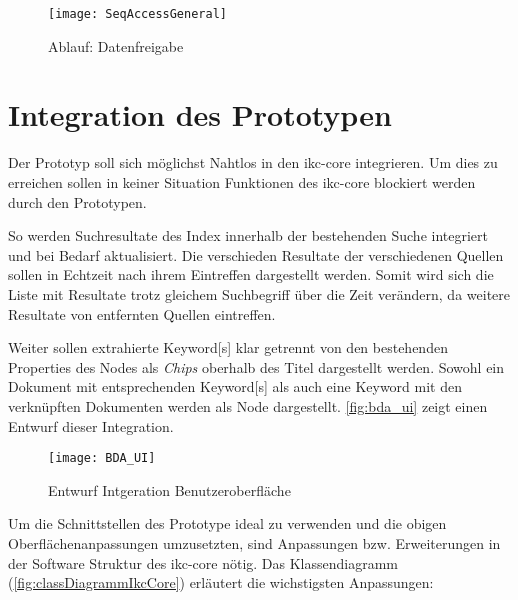 
    \begin{figure}[H]
    \centering
    \texttt{[image: SeqAccessGeneral]}
    \caption{Ablauf: Datenfreigabe}
    \label{fig:seqaccesssession}
    \end{figure}


    

\section{Integration des Prototypen}

Der Prototyp soll sich möglichst Nahtlos in den \gls{ikc-core} integrieren. Um dies zu erreichen sollen in keiner Situation Funktionen des \gls{ikc-core} blockiert werden durch den Prototypen. 

So werden Suchresultate des Index innerhalb der bestehenden Suche integriert und bei Bedarf aktualisiert. Die verschieden Resultate der verschiedenen Quellen sollen in Echtzeit nach ihrem Eintreffen dargestellt werden. Somit wird sich die Liste mit Resultate trotz gleichem Suchbegriff über die Zeit verändern, da weitere Resultate von entfernten Quellen eintreffen. 

Weiter sollen extrahierte \gls{Keyword}[s] klar getrennt von den bestehenden Properties des Nodes als \textit{Chips} oberhalb des Titel dargestellt werden. Sowohl ein Dokument mit entsprechenden \gls{Keyword}[s] als auch eine \gls{Keyword} mit den verknüpften Dokumenten werden als Node dargestellt. \autoref{fig:bda_ui} zeigt einen Entwurf dieser Integration. 

    \begin{figure}[H]
    \centering
    \texttt{[image: BDA\_UI]}
    \caption{Entwurf Intgeration Benutzeroberfläche}
    \label{fig:bda_ui}
    \end{figure}

Um die Schnittstellen des Prototype ideal zu verwenden und die obigen Oberflächenanpassungen umzusetzten, sind Anpassungen bzw. Erweiterungen in der Software Struktur des \gls{ikc-core} nötig. Das Klassendiagramm (\autoref{fig:classDiagrammIkcCore}) erläutert die wichstigsten Anpassungen:


